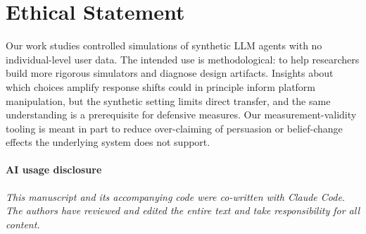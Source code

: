 \documentclass[letterpaper]{article} %
\begin{document}
\section*{Ethical Statement}

Our work studies controlled simulations of synthetic LLM agents with no individual-level user data. The intended use is methodological: to help researchers build more rigorous simulators and diagnose design artifacts. Insights about which choices amplify response shifts could in principle inform platform manipulation, but the synthetic setting limits direct transfer, and the same understanding is a prerequisite for defensive measures. Our measurement-validity tooling is meant in part to reduce over-claiming of persuasion or belief-change effects the underlying system does not support.


\paragraph{AI usage disclosure}\textit{ This manuscript and its accompanying code were co-written with Claude Code. The authors have reviewed and edited the entire text and take responsibility for all content.}


\end{document}
